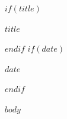 \documentclass[
  fontsize=11pt,
$if(lang)$
  $babel-lang$,
$endif$
  paper=a4
]{article}
\begin{document}
$if(title)$
\begin{center}
  { \centering\Huge\bfseries\sffamily\sectionfont $title$ }
\end{center}
$endif$
$if(date)$
\begin{center}
  { \centering $date$ }
\end{center}
$endif$



$body$
\end{document}
